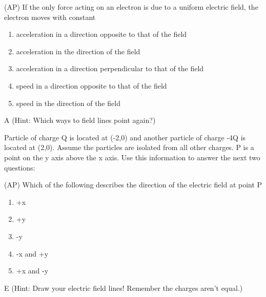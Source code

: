 \begin{question}
(AP) If the only force acting on an electron is due to a uniform electric field, the electron moves with constant
\begin{enumerate}[label=(\alph*)]
    \item acceleration in a direction opposite to that of the field
    \item acceleration in the direction of the field
    \item acceleration in a direction perpendicular to that of the field
    \item speed in a direction opposite to that of the field
    \item speed in the direction of the field
\end{enumerate}

\end{question}

\begin{solution}
A (Hint: Which ways to field lines point again?)
\end{solution}

\newpage
Particle of charge Q is located at (-2,0) and another particle of charge -4Q is located at (2,0). Assume the particles are isolated from all other charges. P is a point on the y axis above the x axis. Use this information to answer the next two questions:

\begin{question}
(AP) Which of the following describes the direction of the electric field at point P
\begin{multicols}{5}
\begin{enumerate}[label=(\alph*)]
    \item +x
    \item +y
    \item -y
    \item -x and +y
    \item +x and -y
\end{enumerate}
\end{multicols}

\end{question}

\begin{solution}
E (Hint: Draw your electric field lines! Remember the charges aren't equal.)
\end{solution}

